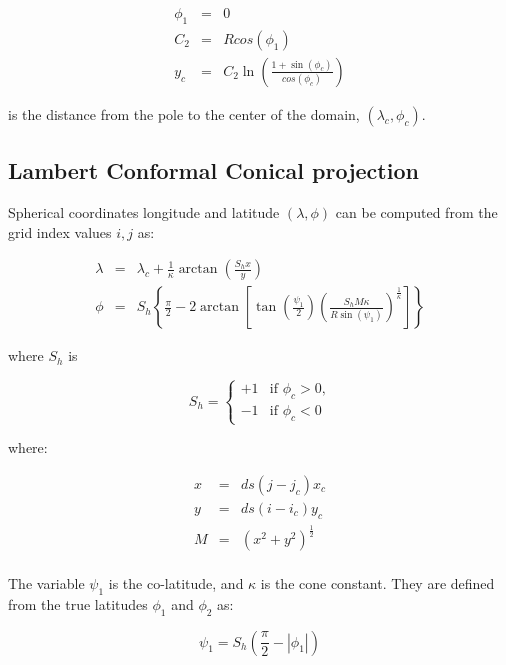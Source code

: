 \begin{eqnarray}
  \phi_1 &=& 0 \\
  C_2 &=& R cos(\phi_1) \\
  y_c &=& C_2 \ln \left(\frac{1+\sin(\phi_c)}{cos(\phi_c)}\right)
\end{eqnarray}

is the distance from the pole to the center of the domain, $(\lambda_c,\phi_c)$.

\subsection{Lambert Conformal Conical projection}

Spherical coordinates longitude and latitude $(\lambda, \phi)$ can be computed
from the grid index values $i,j$ as:

\begin{eqnarray}
  \lambda &=& \lambda_c +
         \frac{1}{\kappa}\arctan\left(\frac{S_h x}{y}\right) \\
   \phi &=& S_h \left\{ \frac{\pi}{2} - 
          2 \arctan\left[ \tan\left(\frac{\psi_1}{2}\right) \left(
         \frac{S_h M \kappa}{R \sin(\psi_1)}\right)^{\frac{1}{\kappa}}\right]
         \right\}
\end{eqnarray}

where $S_h$ is

\begin{equation}
  S_h = 
  \begin{cases}
    +1 & \text{if $\phi_c > 0$,} \\
    -1 & \text{if $\phi_c < 0$}
  \end{cases}
\end{equation}

where:

\begin{eqnarray}
  x &=& ds \left(j-j_c\right) x_c \\
  y &=& ds \left(i-i_c\right) y_c \\
  M &=& \left(x^2+y^2\right)^{\frac{1}{2}} \\
\end{eqnarray}

The variable $\psi_1$ is the co-latitude, and $\kappa$ is the cone constant.
They are defined from the true latitudes $\phi_1$ and $\phi_2$ as:

\begin{equation}
  \psi_1 = S_h \left(\frac{\pi}{2} - |\phi_1| \right)
\end{equation}

